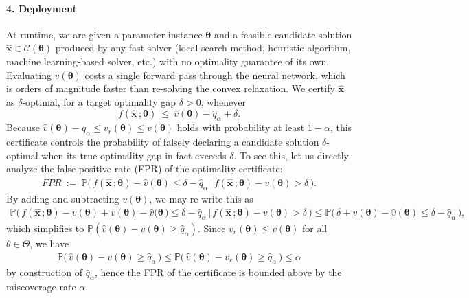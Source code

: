 \documentclass[10pt]{article} %
\theoremstyle{plain}
\theoremstyle{definition}
\theoremstyle{remark}
\begin{document}
\paragraph{4. Deployment} At runtime, we are given a parameter instance $\bm{\theta}$ and a feasible candidate solution $\hat{\mathbf{x}} \in \mathcal{C}(\bm{\theta})$ produced by any fast solver (local search method, heuristic algorithm, machine learning-based solver, etc.) with no optimality guarantee of its own. Evaluating $\hat{v}(\bm{\theta})$ costs a single forward pass through the neural network, which is orders of magnitude faster than re-solving the convex relaxation. We certify $\hat{\mathbf{x}}$ as $\delta$-optimal, for a target optimality gap $\delta > 0$, whenever
\begin{equation*}
    f(\hat{\mathbf{x}}\, ; \bm{\theta}) ~\leq~ \hat{v}(\bm{\theta}) - \hat{q}_\alpha + \delta.
\end{equation*}
Because $\hat{v}(\bm{\theta}) - \hat{q}_\alpha \leq v_r(\bm{\theta}) \leq v(\bm{\theta})$ holds with probability at least $1 - \alpha$, this certificate controls the probability of falsely declaring a candidate solution $\delta$-optimal when its true optimality gap in fact exceeds $\delta$.
To see this, let us directly analyze the false positive rate (FPR) of the optimality certificate:
\begin{align*}
    \mathit{FPR} ~:=~ \mathbb{P} \big( \, f(\hat{\mathbf{x}}\, ; \bm{\theta}) - \hat{v}(\bm{\theta}) \leq \delta - \hat{q}_\alpha \,|\, f(\hat{\mathbf{x}}\, ; \bm{\theta}) - v(\bm{\theta}) > \delta \, \big).
\end{align*}
By adding and subtracting $v(\bm{\theta})$, we may re-write this as
\begin{align*}
    \mathbb{P} \big( \, f(\hat{\mathbf{x}}\, ; \bm{\theta}) - v(\bm{\theta}) + v(\bm{\theta}) - \hat{v}(\bm{\theta} \, \big) \leq \delta - \hat{q}_\alpha \,|\, f(\hat{\mathbf{x}}\, ; \bm{\theta}) - v(\bm{\theta}) > \delta \, \big)
    \leq \mathbb{P} \big( \, \delta + v(\bm{\theta}) - \hat{v}(\bm{\theta}) \leq \delta - \hat{q}_\alpha \, \big),
\end{align*}
which simplifies to $\mathbb{P}(\hat{v}(\bm{\theta}) - v(\bm{\theta}) \geq \hat{q}_\alpha)$. Since $v_r(\bm{\theta}) \leq v(\bm{\theta})$ for all $\theta \in \Theta$, we have
\begin{align*}
    \mathbb{P}\big( \, \hat{v}(\bm{\theta}) - v(\bm{\theta}) \geq \hat{q}_\alpha \, \big ) \leq \mathbb{P} \big( \, \hat{v}(\bm{\theta}) - v_r(\bm{\theta}) \geq \hat{q}_\alpha \, \big) \leq \alpha
\end{align*}
by construction of $\hat{q}_\alpha$, hence the FPR of the certificate is bounded above by the miscoverage rate $\alpha$.
\end{document}
